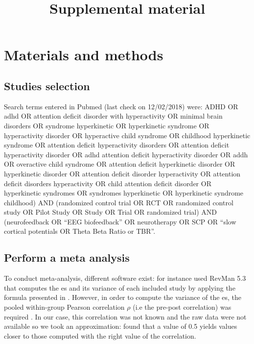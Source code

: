 \documentclass[12pt,a4paper,english]{article}
\begin{document}
\title{Supplemental material}
\date{}
\maketitle

\section{Materials and methods}

\subsection{Studies selection}

Search terms entered in Pubmed (last check on 12/02/2018) were: 
\guillemotleft ADHD OR adhd OR attention deficit disorder with hyperactivity OR minimal brain disorders OR syndrome hyperkinetic OR hyperkinetic
syndrome OR hyperactivity disorder OR hyperactive child syndrome OR childhood hyperkinetic syndrome OR attention deficit hyperactivity disorders
OR attention deficit hyperactivity disorder OR adhd attention deficit hyperactivity disorder OR addh OR overactive child syndrome OR attention deficit hyperkinetic 
disorder OR hyperkinetic disorder OR attention deficit disorder hyperactivity OR attention deficit disorders hyperactivity OR child attention deficit disorder 
OR hyperkinetic syndromes OR syndromes hyperkinetic OR hyperkinetic syndrome childhood) AND (randomized control trial OR RCT OR randomized control study OR Pilot
Study OR Study OR Trial OR randomized trial) AND (neurofeedback OR “EEG biofeedback” OR neurotherapy OR SCP OR “slow cortical potentials OR Theta Beta Ratio or TBR”\guillemotright.


\subsection{Perform a meta analysis}

To conduct meta-analysis, different software exist: for instance \citet{Cortese2016} used RevMan 5.3 \citep{RevMan} that computes the \gls{es} and its 
variance of each included study by applying the formula presented in \citet{Morris2008}. However, in order to compute the variance of the \gls{es}, 
the pooled within-group Pearson correlation $\rho$ (i.e the pre-post correlation) was required 
\citep{James2013}. In our case, this correlation was not known and the raw data were not available so we took an
 approximation: \citet{Balk2012} found that a value of 0.5 yields values closer to those computed with the right value of the correlation. 
\end{document}
